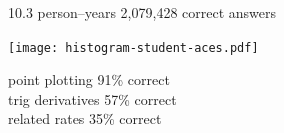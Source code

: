 \documentclass[14pt]{beamer}
\begin{document}
\begin{frame}[nofills]
\huge
\vfill
10.3 person--years
\vfill
2,079,428 correct answers
\vfill
\end{frame}

\begin{frame}[nofills]
\begin{center}
\texttt{[image: histogram-student-aces.pdf]}
\end{center}
\end{frame}

\begin{frame}[nofills]
\vfill
\huge
point plotting \hfill 91\% correct \\
trig derivatives \hfill 57\% correct \\
related rates \hfill 35\% correct \\
\vfill
\end{frame}
\end{document}
